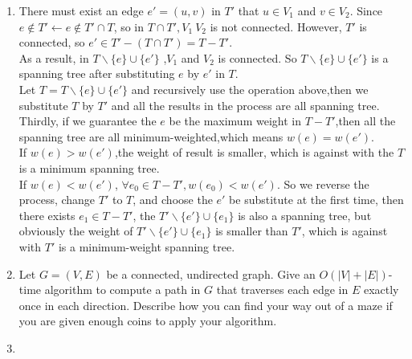 \documentclass[12pt,a4paper]{article}
\makeatletter
\newtheorem*{solution}{Solution}
\theoremstyle{definition}
\renewenvironment{solution}[1][Solution] {\par\pushQED{\qed}\normalfont\topsep6\p@\@plus6\p@\relax\trivlist\item[\hskip\labelsep\bfseries#1\@addpunct{.}]\ignorespaces}{\popQED\endtrivlist\@endpefalse} \makeatother
\makeatother
\begin{document}
\begin{enumerate}
\begin{solution}
\begin{enumerate}
	    There must exist an edge $e'=(u,v)$ in $T'$ that $u\in V_1$ and $v\in V_2$. Since $e\notin  T'\leftarrow e\notin T'\cap T$, so in $T\cap T', V_1~V_2$ is not connected. However, $T'$ is connected, so $e'\in T'-(T\cap T')=T-T'$.\\
	    As a result, in $T\backslash\{e\}\cup \{e'\}$ ,$V_1$ and $V_2$ is connected. So $T\backslash\{e\}\cup \{e'\}$ is a spanning tree after substituting $e$ by $e'$ in $T$.\\
	    Let $T=T\backslash\{e\}\cup \{e'\}$ and recursively use the operation above,then we substitute $T$ by $T'$ and all the results in the process are all spanning tree.\\
	    Thirdly, if we guarantee the $e$ be the maximum weight in $T-T'$,then all the spanning tree are all minimum-weighted,which means $w(e)=w(e')$.\\
	    If $w(e)>w(e')$,the weight of result is smaller, which is against with the $T$ is a minimum spanning tree.\\
	    If $w(e)<w(e')$, $\forall e_0\in T-T', w(e_0)<w(e')$. So we reverse the process, change $T'$ to $T$, and choose the $e'$ be substitute at the first time, then there exists $e_1
	    \in T-T'$, the $T'\backslash\{e'\}\cup\{e_1\}$ is also a spanning tree, but obviously the weight of $T'\backslash\{e'\}\cup\{e_1\}$ is smaller than $T'$, which is against with $T'$ is a minimum-weight spanning tree.
	\end{enumerate}
	\end{solution}
    \item Let $G=(V,E)$ be a connected, undirected graph. Give an $O(|V|+|E|)$-time algorithm
    to compute a path in $G$ that traverses each edge in $E$ exactly once in each direction. Describe how you can find your way out of a maze if you are given enough coins to apply your algorithm.
    \begin{solution}
    ~\par
    	\begin{algorithm}[H]
		

\end{algorithm}
\end{solution}
\end{enumerate}
\end{document}
